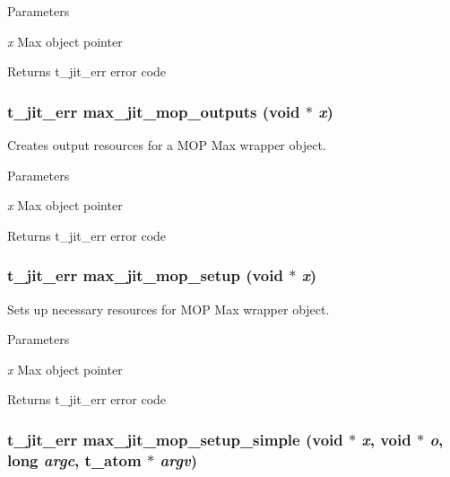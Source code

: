 \begin{DoxyParams}{Parameters}
\item[{\em x}]Max object pointer\end{DoxyParams}
\begin{DoxyReturn}{Returns}
t\_\-jit\_\-err error code 
\end{DoxyReturn}
\hypertarget{group__maxmopmod_ga07f044bc4c7fe4380f31e150844948df}{
\subsubsection[{max\_\-jit\_\-mop\_\-outputs}]{\setlength{\rightskip}{0pt plus 5cm}t\_\-jit\_\-err max\_\-jit\_\-mop\_\-outputs (void $\ast$ {\em x})}}
\label{group__maxmopmod_ga07f044bc4c7fe4380f31e150844948df}


Creates output resources for a MOP Max wrapper object. 
\begin{DoxyParams}{Parameters}
\item[{\em x}]Max object pointer\end{DoxyParams}
\begin{DoxyReturn}{Returns}
t\_\-jit\_\-err error code 
\end{DoxyReturn}
\hypertarget{group__maxmopmod_ga21f81f6d30f54a671a78a6b44986392a}{
\subsubsection[{max\_\-jit\_\-mop\_\-setup}]{\setlength{\rightskip}{0pt plus 5cm}t\_\-jit\_\-err max\_\-jit\_\-mop\_\-setup (void $\ast$ {\em x})}}
\label{group__maxmopmod_ga21f81f6d30f54a671a78a6b44986392a}


Sets up necessary resources for MOP Max wrapper object. 
\begin{DoxyParams}{Parameters}
\item[{\em x}]Max object pointer\end{DoxyParams}
\begin{DoxyReturn}{Returns}
t\_\-jit\_\-err error code 
\end{DoxyReturn}
\hypertarget{group__maxmopmod_gac3eaca207281516b72e81f0dc5f4bf94}{
\subsubsection[{max\_\-jit\_\-mop\_\-setup\_\-simple}]{\setlength{\rightskip}{0pt plus 5cm}t\_\-jit\_\-err max\_\-jit\_\-mop\_\-setup\_\-simple (void $\ast$ {\em x}, \/  void $\ast$ {\em o}, \/  long {\em argc}, \/  {\bf t\_\-atom} $\ast$ {\em argv})}}
\label{group__maxmopmod_gac3eaca207281516b72e81f0dc5f4bf94}


